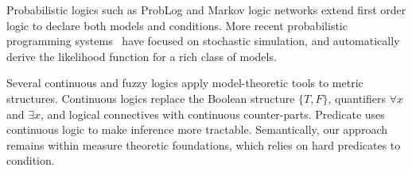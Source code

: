 Probabilistic logics such as ProbLog \cite{richardson2006markov} and Markov logic networks \cite{de2007problog} extend first order logic to declare both models and conditions.
More recent probabilistic programming systems~\citep{milch20071, wood2014new,mansinghka2014venture,goodman2008church,carpenter2017stan} have focused on stochastic simulation, and automatically derive the likelihood function for a rich class of models.



Several continuous \cite{levin2000continuous} and fuzzy \cite{klir1995fuzzy} logics apply model-theoretic tools to metric structures.
Continuous logics replace the Boolean structure $\{T, F\}$, quantifiers $\forall x$ and $\exists x$, and logical connectives with continuous counter-parts.
Predicate uses continuous logic to make inference more tractable. Semantically, our approach remains within measure theoretic foundations, which relies on hard predicates to condition.



